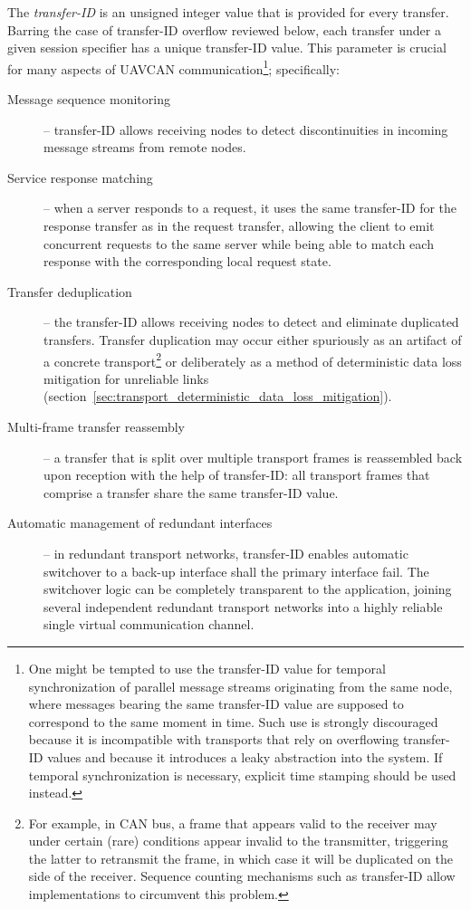 The \emph{transfer-ID} is an unsigned integer value that is provided for every transfer.
Barring the case of transfer-ID overflow reviewed below,
each transfer under a given session specifier has a unique transfer-ID value.
This parameter is crucial for many aspects of UAVCAN communication\footnote{%
    One might be tempted to use the transfer-ID value for temporal synchronization of
    parallel message streams originating from the same node,
    where messages bearing the same transfer-ID value are supposed to correspond to the same moment in time.
    Such use is strongly discouraged because it is incompatible with transports that rely on overflowing
    transfer-ID values and because it introduces a leaky abstraction into the system.
    If temporal synchronization is necessary, explicit time stamping should be used instead.
}; specifically:

\begin{description}
    \item[Message sequence monitoring] -- transfer-ID allows receiving nodes to detect discontinuities
    in incoming message streams from remote nodes.

    \item[Service response matching] -- when a server responds to a request, it uses the same transfer-ID for the
    response transfer as in the request transfer,
    allowing the client to emit concurrent requests to the same server while being able to
    match each response with the corresponding local request state.

    \item[Transfer deduplication] -- the transfer-ID allows receiving nodes to detect and eliminate duplicated
    transfers.
    Transfer duplication may occur either spuriously as an artifact of a concrete transport\footnote{%
        For example, in CAN bus, a frame that appears valid to the receiver may under certain (rare) conditions
        appear invalid to the transmitter, triggering the latter to retransmit the frame,
        in which case it will be duplicated on the side of the receiver.
        Sequence counting mechanisms such as transfer-ID allow implementations to circumvent this problem.
    } or deliberately as a method of deterministic data loss mitigation for unreliable links
    (section~\ref{sec:transport_deterministic_data_loss_mitigation}).

    \item[Multi-frame transfer reassembly] -- a transfer that is split over multiple transport frames is reassembled
    back upon reception with the help of transfer-ID: all transport frames that comprise a transfer
    share the same transfer-ID value.

    \item[Automatic management of redundant interfaces] -- in redundant transport networks,
    transfer-ID enables automatic switchover to a back-up interface shall the primary interface fail.
    The switchover logic can be completely transparent to the application, joining several independent
    redundant transport networks into a highly reliable single virtual communication channel.
\end{description}


